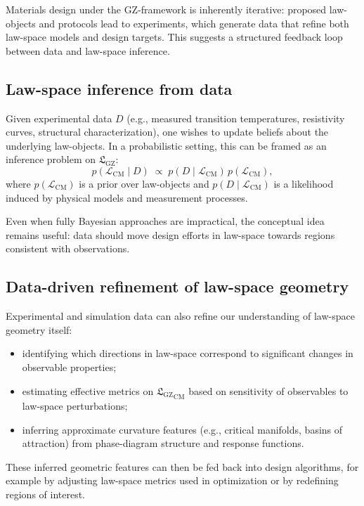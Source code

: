\documentclass[11pt]{book}
\newcommand{\GZLS}{\ensuremath{\mathfrak{L}_{\mathrm{GZ}}}}
\theoremstyle{plain}
\theoremstyle{definition}
\theoremstyle{remark}
\begin{document}
Materials design under the GZ-framework is inherently iterative:
proposed law-objects and protocols lead to experiments, which
generate data that refine both law-space models and design targets.
This suggests a structured feedback loop between data and law-space
inference.

\subsection*{Law-space inference from data}

Given experimental data $D$ (e.g., measured transition temperatures,
resistivity curves, structural characterization), one wishes to
update beliefs about the underlying law-objects. In a probabilistic
setting, this can be framed as an inference problem on $\GZLS$:
\[
   p(\mathcal{L}_{\mathrm{CM}} \mid D)
   \;\propto\;
   p(D \mid \mathcal{L}_{\mathrm{CM}})\,
   p(\mathcal{L}_{\mathrm{CM}}),
\]
where $p(\mathcal{L}_{\mathrm{CM}})$ is a prior over law-objects and
$p(D \mid \mathcal{L}_{\mathrm{CM}})$ is a likelihood induced by
physical models and measurement processes.

Even when fully Bayesian approaches are impractical, the conceptual
idea remains useful: data should move design efforts in law-space
towards regions consistent with observations.

\subsection*{Data-driven refinement of law-space geometry}

Experimental and simulation data can also refine our understanding
of law-space geometry itself:
\begin{itemize}
  \item identifying which directions in law-space correspond to
        significant changes in observable properties;
  \item estimating effective metrics on ${\GZLS}_{\mathrm{CM}}$ based
        on sensitivity of observables to law-space perturbations;
  \item inferring approximate curvature features (e.g., critical
        manifolds, basins of attraction) from phase-diagram
        structure and response functions.
\end{itemize}

These inferred geometric features can then be fed back into design
algorithms, for example by adjusting law-space metrics used in
optimization or by redefining regions of interest.
\end{document}
